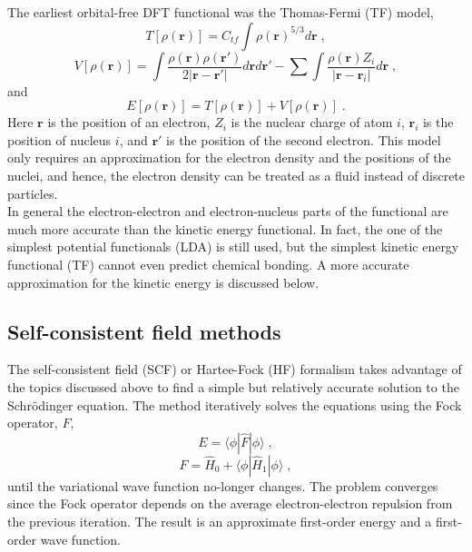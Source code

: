 \documentclass[12pt]{report}
\begin{document}
The earliest orbital-free DFT functional was the Thomas-Fermi (TF) model,
\begin{equation}
 T[\rho(\textbf{r})] = C_{tf}\int \rho(\textbf{r})^{5/3}d\textbf{r} \; ,
\end{equation}
\begin{equation}
 V[\rho(\textbf{r})] = \int
 \frac{\rho(\textbf{r})\rho(\textbf{r}')}{2|\textbf{r}-\textbf{r}'|}
 d\textbf{r}d\textbf{r}'
 -\sum \int \frac{\rho(\textbf{r})Z_i}{|\textbf{r}-\textbf{r}_i|} d\textbf{r}
 \; ,
\end{equation}
and
\begin{equation}
 E[\rho(\textbf{r})] = T[\rho(\textbf{r})]+V[\rho(\textbf{r})] \; .
\end{equation}
Here $\textbf{r}$ is the position of an electron, $Z_i$ is the nuclear charge
of atom $i$, $\textbf{r}_i$ is the position of nucleus $i$, and $\textbf{r}'$
is the position of the second electron. This model only requires an
approximation for the electron density and the positions of the nuclei, and
hence, the electron density can be treated as a fluid instead of discrete
particles. \\

In general the electron-electron and electron-nucleus parts of the functional
are much more accurate than the kinetic energy functional. In fact, the one of
the simplest potential functionals (LDA) is still used, but the simplest
kinetic energy functional (TF) cannot even predict chemical bonding. A more
accurate approximation for the kinetic energy is discussed below.

\subsection{Self-consistent field methods}

The self-consistent field (SCF) or Hartee-Fock (HF) formalism takes advantage
of the topics discussed above to find a simple but relatively accurate
solution to the Schr\"{o}dinger equation. The method iteratively solves the
equations using the Fock operator, $F$,
\begin{equation}
 E = \langle\phi|\hat F|\phi\rangle \; ,
\end{equation}
\begin{equation}
 \hat F = \hat H_0+\langle\phi|\hat H_1|\phi\rangle \; ,
\end{equation}
until the variational wave function no-longer changes. The problem converges
since the Fock operator depends on the average electron-electron repulsion
from the previous iteration. The result is an approximate first-order energy
and a first-order wave function. \\
\end{document}
